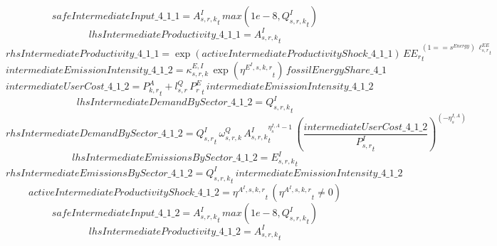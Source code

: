\begin{dmath*}
safeIntermediateInput\_4\_1\_1 = {{A^{I}_{s,r,k}}}_{t}\, max(1e-8,{{Q^{I}_{s,r,k}}}_{t})
\end{dmath*}
\begin{dmath*}
lhsIntermediateProductivity\_4\_1\_1 = {{A^{I}_{s,r,k}}}_{t}
\end{dmath*}
\begin{dmath*}
rhsIntermediateProductivity\_4\_1\_1 = \exp\left({activeIntermediateProductivityShock\_4\_1\_1}\right)\, {{EE_r}}_{t}^{\left(1=={{s^{Energy}}}\right)\, {{\ell^{EE}_{s,r}}}_{t}}
\end{dmath*}
\begin{dmath*}
intermediateEmissionIntensity\_4\_1\_2 = {{\kappa^{E,I}_{s,r,k}}}\, \exp\left({{\eta^{E^{I},s,k,r}}}_{t}\right)\, {fossilEnergyShare\_4\_1}
\end{dmath*}
\begin{dmath*}
intermediateUserCost\_4\_1\_2 = {{P^{A}_{k,r}}}_{t}+{{l^{Q}_{s,r}}}\, {{P^E_r}}_{t}\, {intermediateEmissionIntensity\_4\_1\_2}
\end{dmath*}
\begin{dmath*}
lhsIntermediateDemandBySector\_4\_1\_2 = {{Q^{I}_{s,r,k}}}_{t}
\end{dmath*}
\begin{dmath*}
rhsIntermediateDemandBySector\_4\_1\_2 = {{Q^{I}_{s,r}}}_{t}\, {{\omega^{Q}_{s,r,k}}}\, {{A^{I}_{s,r,k}}}_{t}^{{{\eta^{I,A}_{s}}}-1}\, \left(\frac{{intermediateUserCost\_4\_1\_2}}{{{P^{I}_{s,r}}}_{t}}\right)^{\left(-{{\eta^{I,A}_{s}}}\right)}
\end{dmath*}
\begin{dmath*}
lhsIntermediateEmissionsBySector\_4\_1\_2 = {{E^I_{s,r,k}}}_{t}
\end{dmath*}
\begin{dmath*}
rhsIntermediateEmissionsBySector\_4\_1\_2 = {{Q^{I}_{s,r,k}}}_{t}\, {intermediateEmissionIntensity\_4\_1\_2}
\end{dmath*}
\begin{dmath*}
activeIntermediateProductivityShock\_4\_1\_2 = {{\eta^{A^{I},s,k,r}}}_{t}\, \left({{\eta^{A^{I},s,k,r}}}_{t}\neq 0\right)
\end{dmath*}
\begin{dmath*}
safeIntermediateInput\_4\_1\_2 = {{A^{I}_{s,r,k}}}_{t}\, max(1e-8,{{Q^{I}_{s,r,k}}}_{t})
\end{dmath*}
\begin{dmath*}
lhsIntermediateProductivity\_4\_1\_2 = {{A^{I}_{s,r,k}}}_{t}
\end{dmath*}
